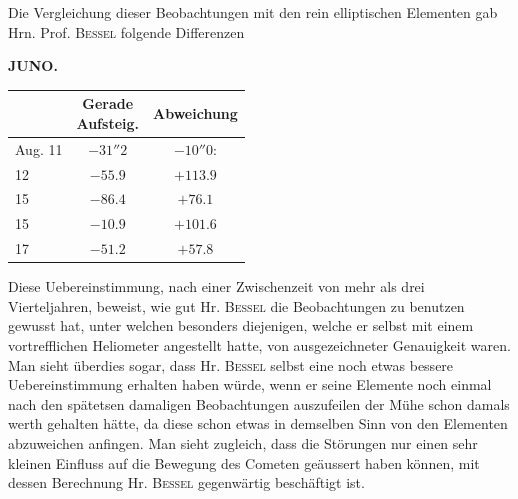 \par\indent Die Vergleichung dieser Beobachtungen mit den rein elliptischen Elementen gab Hrn. Prof. \textsc{Bessel} folgende Differenzen
\clearpage
\thispagestyle{empty}
\noindent{}%
\makebox[12mm][l]{}%
\parbox[t]{\dimexpr\linewidth-24mm\relax}{\centering\footnotesize\bfseries JUNO.\par}%
\par\nobreak\medskip
\begin{center}\fontsize{10}{12}\selectfont\setlength{\tabcolsep}{8pt}\renewcommand{\arraystretch}{1.15}\begin{tabular}{l|c|c}
& \shortstack{Gerade\\Aufsteig.} & Abweichung\\\hline
Aug. 11 & $-31''2$ & $-10''0$:\\
12 & $-55.9$ & $+113.9$\\
15 & $-86.4$ & $+76.1$\\
15 & $-10.9$ & $+101.6$\\
17 & $-51.2$ & $+57.8$\\
\end{tabular}\end{center}

\par\indent Diese Uebereinstimmung, nach einer Zwischenzeit von mehr als drei Vierteljahren, beweist, wie gut Hr. \textsc{Bessel} die Beobachtungen zu benutzen gewusst hat, unter welchen besonders diejenigen, welche er selbst mit einem vortrefflichen Heliometer angestellt hatte, von ausgezeichneter Genauigkeit waren. Man sieht überdies sogar, dass Hr. \textsc{Bessel} selbst eine noch etwas bessere Uebereinstimmung erhalten haben würde, wenn er seine Elemente noch einmal nach den spätetsen 
damaligen Beobachtungen auszufeilen der Mühe schon damals werth gehalten hätte, da diese schon etwas in demselben Sinn von den Elementen abzuweichen anfingen. Man sieht zugleich, dass die Störungen nur einen sehr kleinen Einfluss auf die Bewegung des Cometen geäussert haben können, mit dessen Berechnung Hr. \textsc{Bessel} gegenwärtig beschäftigt ist.
